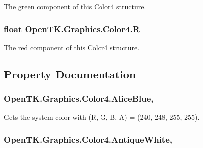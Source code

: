The green component of this \hyperlink{struct_open_t_k_1_1_graphics_1_1_color4}{Color4} structure. 

\hypertarget{struct_open_t_k_1_1_graphics_1_1_color4_a5c6bb945ffd883234ed9cea93947b8c4}{
\subsubsection[{R}]{\setlength{\rightskip}{0pt plus 5cm}float Open\-T\-K.\-Graphics.\-Color4.\-R}}\label{struct_open_t_k_1_1_graphics_1_1_color4_a5c6bb945ffd883234ed9cea93947b8c4}


The red component of this \hyperlink{struct_open_t_k_1_1_graphics_1_1_color4}{Color4} structure. 



\subsection{Property Documentation}
\hypertarget{struct_open_t_k_1_1_graphics_1_1_color4_a0256eea660be36faebb89f2c1a67cbb9}{
\subsubsection[{Alice\-Blue}]{ Open\-T\-K.\-Graphics.\-Color4.\-Alice\-Blue\hspace{0.3cm}{\ttfamily [static]}, {\ttfamily [get]}}}\label{struct_open_t_k_1_1_graphics_1_1_color4_a0256eea660be36faebb89f2c1a67cbb9}


Gets the system color with (R, G, B, A) = (240, 248, 255, 255). 

\hypertarget{struct_open_t_k_1_1_graphics_1_1_color4_a77b9e67d5656ff850cf4379674bc04c2}{
\subsubsection[{Antique\-White}]{ Open\-T\-K.\-Graphics.\-Color4.\-Antique\-White\hspace{0.3cm}{\ttfamily [static]}, {\ttfamily [get]}}}\label{struct_open_t_k_1_1_graphics_1_1_color4_a77b9e67d5656ff850cf4379674bc04c2}


